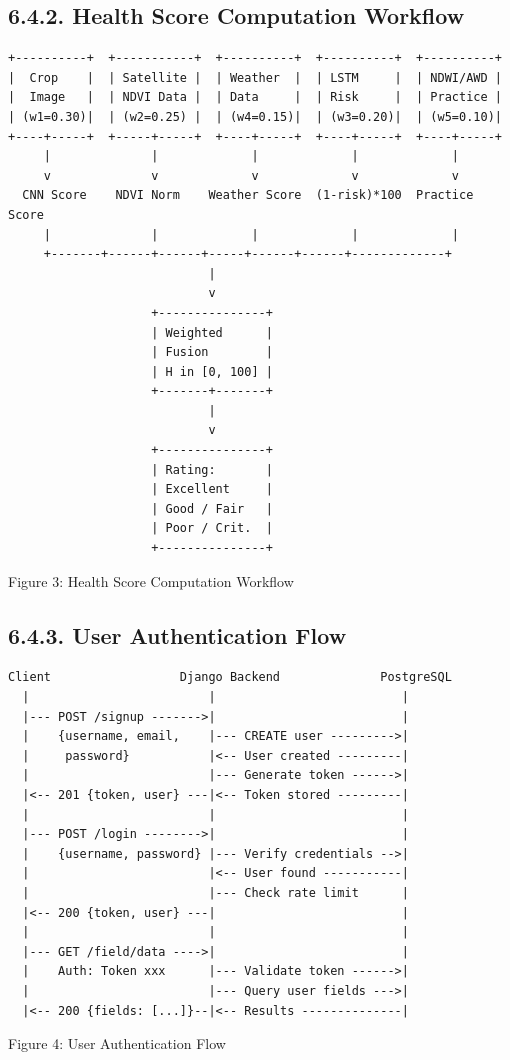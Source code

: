 \documentclass[12pt, a4paper]{report}
\begin{document}
\subsection{6.4.2. Health Score Computation Workflow}
\begin{Verbatim}[fontsize=\small]
+----------+  +-----------+  +----------+  +----------+  +----------+
|  Crop    |  | Satellite |  | Weather  |  | LSTM     |  | NDWI/AWD |
|  Image   |  | NDVI Data |  | Data     |  | Risk     |  | Practice |
| (w1=0.30)|  | (w2=0.25) |  | (w4=0.15)|  | (w3=0.20)|  | (w5=0.10)|
+----+-----+  +-----+-----+  +----+-----+  +----+-----+  +----+-----+
     |              |             |             |             |
     v              v             v             v             v
  CNN Score    NDVI Norm    Weather Score  (1-risk)*100  Practice Score
     |              |             |             |             |
     +-------+------+------+-----+------+------+-------------+
                            |
                            v
                    +---------------+
                    | Weighted      |
                    | Fusion        |
                    | H in [0, 100] |
                    +-------+-------+
                            |
                            v
                    +---------------+
                    | Rating:       |
                    | Excellent     |
                    | Good / Fair   |
                    | Poor / Crit.  |
                    +---------------+
\end{Verbatim}
Figure 3: Health Score Computation Workflow

\subsection{6.4.3. User Authentication Flow}
\begin{Verbatim}[fontsize=\small]
Client                  Django Backend              PostgreSQL
  |                         |                          |
  |--- POST /signup ------->|                          |
  |    {username, email,    |--- CREATE user --------->|
  |     password}           |<-- User created ---------|
  |                         |--- Generate token ------>|
  |<-- 201 {token, user} ---|<-- Token stored ---------|
  |                         |                          |
  |--- POST /login -------->|                          |
  |    {username, password} |--- Verify credentials -->|
  |                         |<-- User found -----------|
  |                         |--- Check rate limit      |
  |<-- 200 {token, user} ---|                          |
  |                         |                          |
  |--- GET /field/data ---->|                          |
  |    Auth: Token xxx      |--- Validate token ------>|
  |                         |--- Query user fields --->|
  |<-- 200 {fields: [...]}--|<-- Results --------------|
\end{Verbatim}
Figure 4: User Authentication Flow
\end{document}
